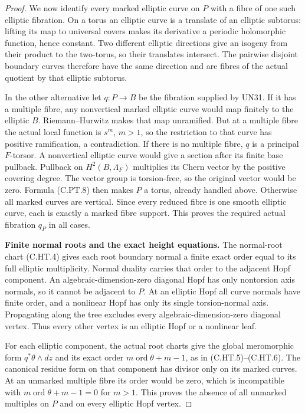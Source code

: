 \begin{proof}
We now identify every marked elliptic curve on $P$
with a fibre of one such elliptic fibration.
On a torus an elliptic curve is a translate of an
elliptic subtorus: lifting its map to universal
covers makes its derivative a periodic holomorphic
function, hence constant. Two different elliptic
directions give an isogeny from their product to
the two-torus, so their translates intersect.
The pairwise disjoint boundary curves therefore
have the same direction and are fibres of the
actual quotient by that elliptic subtorus.

In the other alternative let $q:P\to B$ be the
fibration supplied by UN31. If it has a multiple
fibre, any nonvertical marked elliptic curve would
map finitely to the elliptic $B$. Riemann--Hurwitz
makes that map unramified. But at a multiple fibre
the actual local function is $s^m$, $m>1$,
so the restriction to that curve has positive
ramification, a contradiction.
If there is no multiple fibre, $q$ is a principal
$F$-torsor. A nonvertical elliptic curve would give
a section after its finite base pullback. Pullback
on $H^2(B,\Lambda_F)$ multiplies its Chern vector
by the positive covering degree. The vector group
is torsion-free, so the original vector would be
zero. Formula (C.PT.8) then makes $P$ a torus,
already handled above. Otherwise all marked
curves are vertical. Since every reduced fibre
is one smooth elliptic curve, each is exactly
a marked fibre support. This proves the required
actual fibration $q_P$ in all cases.

\par\medskip\noindent\textbf{Finite normal roots and the exact height equations.}
The normal-root chart (C.HT.4) gives each root
boundary normal a finite exact order equal to its
full elliptic multiplicity. Normal duality carries
that order to the adjacent Hopf component.
An algebraic-dimension-zero diagonal Hopf has only
nontorsion axis normals, so it cannot be adjacent
to $P$. At an elliptic Hopf all curve normals have
finite order, and a nonlinear Hopf has only its
single torsion-normal axis. Propagating along the
tree excludes every algebraic-dimension-zero
diagonal vertex. Thus every other vertex is an
elliptic Hopf or a nonlinear leaf.

For each elliptic component, the actual root
charts give the global meromorphic form
$q^*\theta\wedge dz$ and its exact order
$m\operatorname{ord}\theta+m-1$, as in
(C.HT.5)--(C.HT.6). The canonical residue form
on that component has divisor only on its
marked curves. At an unmarked multiple fibre
its order would be zero, which is incompatible
with $m\operatorname{ord}\theta+m-1=0$ for
$m>1$. This proves the absence of all unmarked
multiples on $P$ and on every elliptic Hopf
vertex.


\end{proof}
